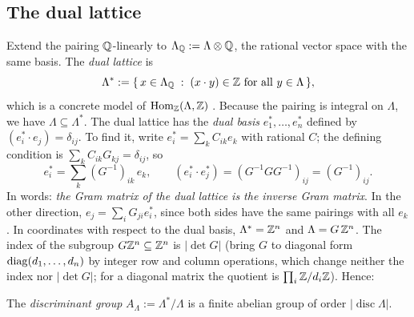 \subsection{The dual lattice}
Extend the pairing $\mathbb{Q}$-linearly to $\Lambda_{\mathbb{Q}}:=\Lambda\otimes\mathbb{Q}$, the rational vector
space with the same basis. The \emph{dual lattice} is
\begin{equation}\label{eq:lattices:dualdef}
 \Lambda^*:=\{\,x\in\Lambda_{\mathbb{Q}}\;:\;(x\cdot y)\in\mathbb{Z}\ \text{for all }y\in\Lambda\,\},
\end{equation}
which is a concrete model of $\operatorname{Hom}_{\mathbb{Z}}(\Lambda,\mathbb{Z})$
. Because the pairing is integral on $\Lambda$, we have
$\Lambda\subseteq\Lambda^*$. The dual lattice has the \emph{dual basis} $e_1^*,\dots,e_n^*$
defined by $(e_i^*\cdot e_j)=\delta_{ij}$. To find it, write
$e_i^*=\sum_kC_{ik}e_k$ with rational $C$; the defining condition is
$\sum_kC_{ik}G_{kj}=\delta_{ij}$, so
\begin{equation}\label{eq:lattices:dualbasis}
 e_i^*=\sum_k(G^{-1})_{ik}\,e_k,\qquad (e_i^*\cdot e_j^*)=(G^{-1}GG^{-1})_{ij}=(G^{-1})_{ij}.
\end{equation}
In words: \emph{the Gram matrix of the dual lattice is the inverse Gram matrix}. In the other
direction, $e_j=\sum_iG_{ji}e_i^*$, since both sides have the same pairings with all $e_k$.
In coordinates with respect to the dual basis, $\Lambda^*=\mathbb{Z}^n$ and $\Lambda=G\,\mathbb{Z}^n$.
The index of the subgroup $G\mathbb{Z}^n\subseteq\mathbb{Z}^n$ is $|\det G|$ (bring $G$ to diagonal form
$\operatorname{diag}(d_1,\dots,d_n)$ by integer row and column operations, which change neither the index
nor $|\det G|$; for a diagonal matrix the quotient is $\prod_i\mathbb{Z}/d_i\mathbb{Z}$). Hence:

\begin{proposition}\label{prop:lattices:index}
The \emph{discriminant group} $A_\Lambda:=\Lambda^*/\Lambda$ is a
finite abelian group of order $|\operatorname{disc}\Lambda|$.
\end{proposition}


